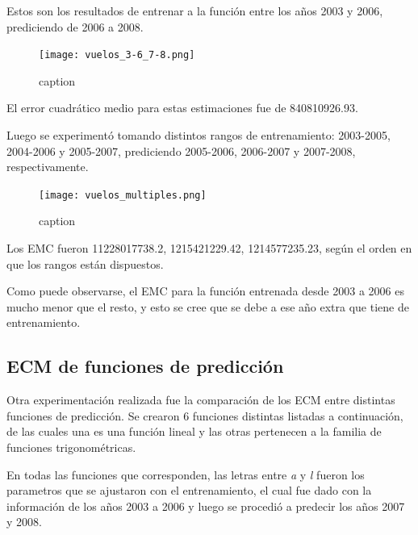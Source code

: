 Estos son los resultados de entrenar a la función entre los años 2003 y 2006, prediciendo de 2006 a 2008.

\begin{figure}[!htb]
\begin{center}
\texttt{[image: vuelos\_3-6\_7-8.png]}
\caption{caption}
\label{vuelos-1}
\end{center}
\end{figure}

El error cuadrático medio para estas estimaciones fue de 840810926.93.

Luego se experimentó tomando distintos rangos de entrenamiento: 2003-2005, 2004-2006 y 2005-2007, prediciendo 2005-2006, 2006-2007 y 2007-2008, respectivamente.

\begin{figure}[!htb]
\begin{center}
\texttt{[image: vuelos\_multiples.png]}
\caption{caption}
\label{vuelos-2}
\end{center}
\end{figure}

Los EMC fueron 11228017738.2, 1215421229.42, 1214577235.23, según el orden en que los rangos están dispuestos.

Como puede observarse, el EMC para la función entrenada desde 2003 a 2006 es mucho menor que el resto, y esto se cree que se debe a ese año extra que tiene de entrenamiento.


\subsection{ECM de funciones de predicción}

Otra experimentación realizada fue la comparación de los ECM entre distintas funciones de predicción. Se crearon 6 funciones distintas listadas a continuación, de las cuales una es una función lineal y las otras pertenecen a la familia de funciones trigonométricas.

En todas las funciones que corresponden, las letras entre \textit{a} y \textit{l} fueron los parametros que se ajustaron con el entrenamiento, el cual fue dado con la información de los años 2003 a 2006 y luego se procedió a predecir los años 2007 y 2008.

